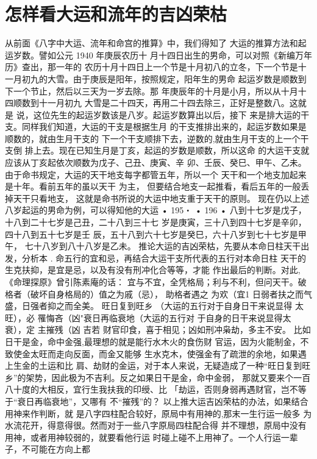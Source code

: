 \section{怎样看大运和流年的吉凶荣枯}
从前面《八字中大运、流年和命宫的推算》中，我们得知了
大运的推算方法和起运岁数。譬如公元 1940 年庚辰农历十
月十四日出生的男命，可以对照《新编万年历》查出，那一年的
农历十月十四日上一个节是十月初八的立冬，下一个节是十
一月初九的大雪。由于庚辰是阳年，按照规定，阳年生的男命
起运岁数是顺数到下一个节止，然后以三天为一岁去除。那
年庚辰年的十月是小月，所以从十月十四顺数到十一月初九
大雪是二十四天，再用二十四去除三，正好是整数八。这就是
说，这位先生的起运岁数该是八岁。起运岁数算出以后，接下
来是排大运的干支。同样我们知道，大运的干支是根据生月
的干支推排出来的，起运岁数如果是顺数的，就由生月干支的
下一个干支顺排下去，逆数的,就由生月干支的上一个干支倒
排上去。现在已知生月是丁亥，起运的岁数是顺数，所以这命
的大运干支就应该从丁亥起依次顺数为戊子、己丑、庚寅、辛
卯、壬辰、癸巳、甲午、乙未。
由于命书规定，大运的天干地支每字都管五年，所以一个
天干和一个地支加起来是十年。看前五年的虽以天干 为主，
但要结合地支一起推看，看后五年的一般丢掉天干只看地支，
这就是命书所说的大运中地支重于天干的原则。
现在仍以上述八岁起运的男命为例，可以得知他的大运
• 195・
• 196 •
八到十七岁是戊子，十八到二十七岁是己丑，二十八到三十七
岁是庚寅，三十八到四十七岁是辛卯，四十八到五十七岁是壬
辰，五十八到六十七岁是癸巳，六十八岁到七十七岁是甲午，
七十八岁到八十八岁是乙未。
推论大运的吉凶荣枯，先要从本命日柱天干出发，分析本 .
命五行的宜和忌，再结合大运干支所代表的五行对本命日柱
天干的生克扶抑，是宜是忌，以及有没有刑冲化合等等，才能
作出最后的判断。对此,《命理探原》曾引陈素庵的话：
宜与不宜，全凭格局；利与不利，但问天干。破
格者（破坏自身格局的）值之为戚（忌）， 助格者遇之
为欢（宜1 日弱者扶之而气盛，日强者抑之而全美。
旺日复到旺乡 （大运的五行对于自身日干来说显得
太旺），必 罹悔吝（凶"衰日再临衰地（大运的五行对
于自身的日干来说显得太衰），定 主摧残（凶 吉若
财官印食，喜于相见；凶如刑冲枭劫，多主不安。
比如日干是金，命中金强,最理想的就是能行水木火的食伤财
官运，因为火能制金，不致使金太旺而走向反面，而金又能够
生水克木，使强金有了疏泄的余地，如果遇上生金的土运和比
肩、劫财的金运，对于本人来说，无疑造成了一种“旺日复到旺
乡”的架势，因此极为不吉利。反之如果日干是金，命中金弱，
那就又要来个一百八十度的大相反，宜行生我扶我的印绶、比
「劫运，否则身弱再遇财官，岂不等于“衰日再临衰地”，又哪有
不“摧残”的？
以上推大运吉凶荣枯的办法，如果结合用神来作判断，就
是八字四柱配合较好，原局中有用神的,那末一生行运一般多
为水流花开，得意得很。然而对于一些八字原局四柱配合得
并不理想，原局中没有用神，或者用神较弱的，就要看他行运
时碰上碰不上用神了。一个人行运一辈子，不可能在方向上都
